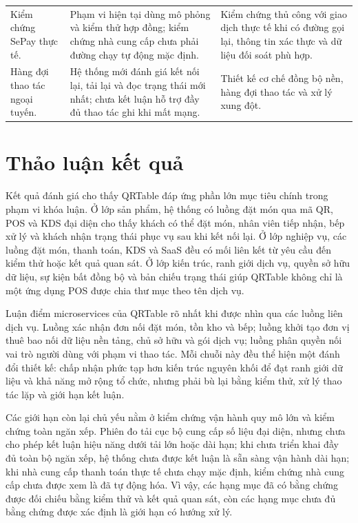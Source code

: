 {\begin{longtable}{>{\raggedright\arraybackslash}p{}>{\raggedright\arraybackslash}p{}>{\raggedright\arraybackslash}p{}}
  Kiểm chứng SePay thực tế. & Phạm vi hiện tại dùng mô phỏng và kiểm thử hợp đồng; kiểm chứng nhà cung cấp chưa phải đường chạy tự động mặc định. & Kiểm chứng thủ công với giao dịch thực tế khi có đường gọi lại, thông tin xác thực và dữ liệu đối soát phù hợp. \\
  Hàng đợi thao tác ngoại tuyến. & Hệ thống mới đánh giá kết nối lại, tải lại và đọc trạng thái mới nhất; chưa kết luận hỗ trợ đầy đủ thao tác ghi khi mất mạng. & Thiết kế cơ chế đồng bộ nền, hàng đợi thao tác và xử lý xung đột. \\
\end{longtable}
}

\section{Thảo luận kết quả}

Kết quả đánh giá cho thấy QRTable đáp ứng phần lớn mục tiêu chính trong phạm vi khóa luận. Ở lớp sản phẩm, hệ thống có luồng đặt món qua mã QR, POS và KDS đại diện cho thấy khách có thể đặt món, nhân viên tiếp nhận, bếp xử lý và khách nhận trạng thái phục vụ sau khi kết nối lại. Ở lớp nghiệp vụ, các luồng đặt món, thanh toán, KDS và SaaS đều có mối liên kết từ yêu cầu đến kiểm thử hoặc kết quả quan sát. Ở lớp kiến trúc, ranh giới dịch vụ, quyền sở hữu dữ liệu, sự kiện bất đồng bộ và bản chiếu trạng thái giúp QRTable không chỉ là một ứng dụng POS được chia thư mục theo tên dịch vụ.

Luận điểm microservices của QRTable rõ nhất khi được nhìn qua các luồng liên dịch vụ. Luồng xác nhận đơn nối đặt món, tồn kho và bếp; luồng khởi tạo đơn vị thuê bao nối dữ liệu nền tảng, chủ sở hữu và gói dịch vụ; luồng phân quyền nối vai trò người dùng với phạm vi thao tác. Mỗi chuỗi này đều thể hiện một đánh đổi thiết kế: chấp nhận phức tạp hơn kiến trúc nguyên khối để đạt ranh giới dữ liệu và khả năng mở rộng tổ chức, nhưng phải bù lại bằng kiểm thử, xử lý thao tác lặp và giới hạn kết luận.

Các giới hạn còn lại chủ yếu nằm ở kiểm chứng vận hành quy mô lớn và kiểm chứng toàn ngăn xếp. Phiên đo tải cục bộ cung cấp số liệu đại diện, nhưng chưa cho phép kết luận hiệu năng dưới tải lớn hoặc dài hạn; khi chưa triển khai đầy đủ toàn bộ ngăn xếp, hệ thống chưa được kết luận là sẵn sàng vận hành dài hạn; khi nhà cung cấp thanh toán thực tế chưa chạy mặc định, kiểm chứng nhà cung cấp chưa được xem là đã tự động hóa. Vì vậy, các hạng mục đã có bằng chứng được đối chiếu bằng kiểm thử và kết quả quan sát, còn các hạng mục chưa đủ bằng chứng được xác định là giới hạn có hướng xử lý.

